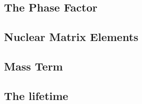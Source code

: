 \subsection{The Phase Factor}

\subsection{Nuclear Matrix Elements}

\subsection{Mass Term}

\subsection{The lifetime}

%
% 
% 
